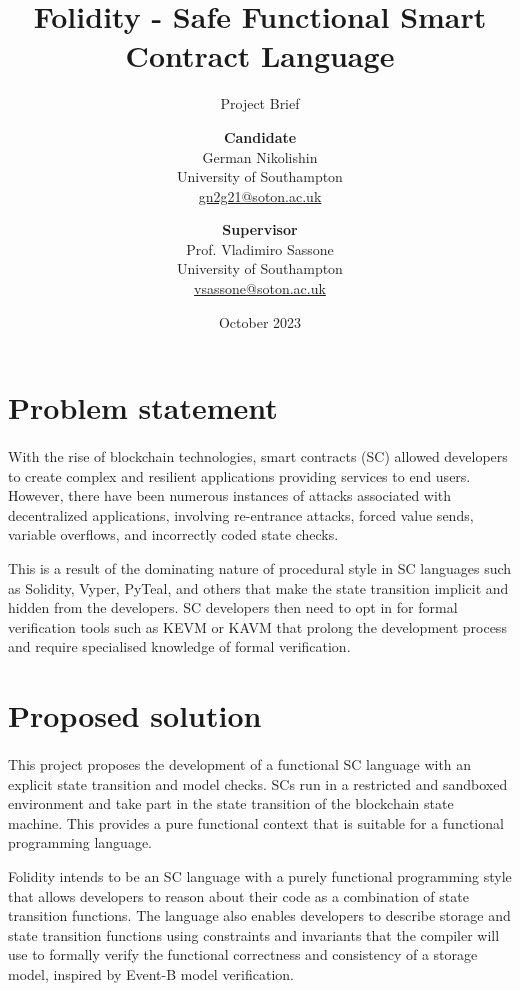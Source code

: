 \documentclass[10pt, a4paper]{article}
\title{Folidity - Safe Functional Smart Contract Language}
\subtitle{Project Brief}
\author{
  \textbf{Candidate}\\
  German Nikolishin\\
  University of Southampton\\
  \href{mailto:gn2g21@soton.ac.uk}{gn2g21@soton.ac.uk}
  \and
  \textbf{Supervisor}\\
  Prof. Vladimiro Sassone\\
  University of Southampton\\
  \href{mailto:vsassone@soton.ac.uk}{vsassone@soton.ac.uk}
}
\date{October 2023}
\begin{document}
\maketitle
\thispagestyle{empty}



\section*{Problem statement}
\paragraph{}
With the rise of blockchain technologies, smart contracts (SC) allowed developers to create complex and resilient applications providing services to end users. However, there have been numerous instances of attacks associated with decentralized applications, involving re-entrance attacks, forced value sends, variable overflows, and incorrectly coded state checks.

This is a result of the dominating nature of procedural style in SC languages such as Solidity, Vyper, PyTeal, and others that make the state transition implicit and hidden from the developers. SC developers then need to opt in for formal verification tools such as KEVM or KAVM that prolong the development process and require specialised knowledge of formal verification.

\section*{Proposed solution}
\paragraph{}
This project proposes the development of a functional SC language with an explicit state transition and model checks. SCs run in a restricted and sandboxed environment and take part in the state transition of the blockchain state machine. This provides a pure functional context that is suitable for a functional programming language. 

Folidity intends to be an SC language with a purely functional programming style that allows developers to reason about their code as a combination of state transition functions. The language also enables developers to describe storage and state transition functions using constraints and invariants that the compiler will use to formally verify the functional correctness and consistency of a storage model, inspired by Event-B model verification.
\end{document}
